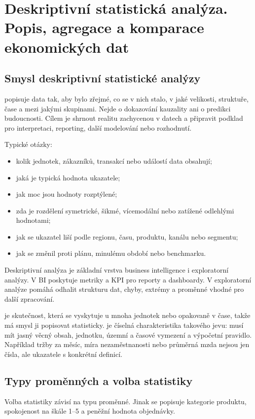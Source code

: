 \section{Deskriptivní statistická analýza. Popis, agregace a komparace ekonomických dat}

\subsection{Smysl deskriptivní statistické analýzy}
 popisuje data tak, aby bylo zřejmé, co se v nich stalo,
v jaké velikosti, struktuře, čase a mezi jakými skupinami. Nejde o dokazování kauzality ani o predikci
budoucnosti. Cílem je shrnout realitu zachycenou v datech a připravit podklad pro interpretaci,
reporting, další modelování nebo rozhodnutí.

Typické otázky:
\begin{itemize}
  \item kolik jednotek, zákazníků, transakcí nebo událostí data obsahují;
  \item jaká je typická hodnota ukazatele;
  \item jak moc jsou hodnoty rozptýlené;
  \item zda je rozdělení symetrické, šikmé, vícemodální nebo zatížené odlehlými hodnotami;
  \item jak se ukazatel liší podle regionu, času, produktu, kanálu nebo segmentu;
  \item jak se změnil proti plánu, minulému období nebo benchmarku.
\end{itemize}

Deskriptivní analýza je základní vrstva business intelligence i exploratorní analýzy. V BI poskytuje
metriky a KPI pro reporty a dashboardy. V exploratorní analýze pomáhá odhalit strukturu dat, chyby,
extrémy a proměnné vhodné pro další zpracování.

 je skutečnost, která se vyskytuje u mnoha jednotek nebo opakovaně v čase, takže
má smysl ji popisovat statisticky.  je číselná charakteristika takového
jevu: musí mít jasný věcný obsah, jednotku, územní a časové vymezení a výpočetní pravidlo. Například
tržby za měsíc, míra nezaměstnanosti nebo průměrná mzda nejsou jen čísla, ale ukazatele s konkrétní
definicí.

\subsection{Typy proměnných a volba statistiky}
Volba statistiky závisí na typu proměnné. Jinak se popisuje kategorie produktu, spokojenost na škále
1--5 a peněžní hodnota objednávky.

